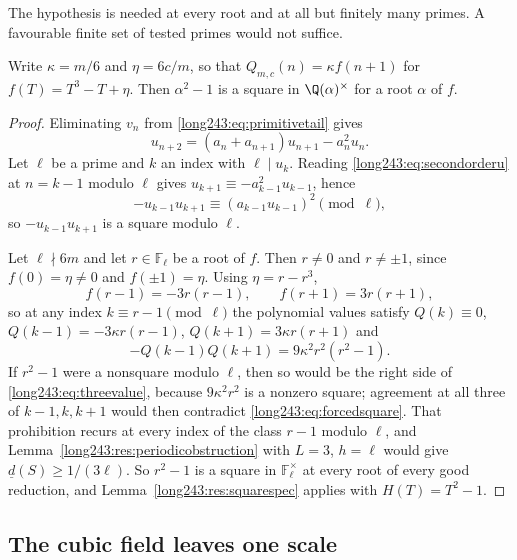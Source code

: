 \documentclass[11pt]{article}
\newcommand{\Fp}{\mathbb{F}}
\begin{document}
The hypothesis is needed at every root and at all but finitely many primes.  A
favourable finite set of tested primes would not suffice.

\begin{proposition}\label{long243:res:transportsquare}
Write $\kappa=m/6$ and $\eta=6c/m$, so that $Q_{m,c}(n)=\kappa f(n+1)$ for
$f(T)=T^3-T+\eta$.  Then $\alpha^2-1$ is a square in $\Q(\alpha)^\times$ for a
root $\alpha$ of $f$.
\end{proposition}

\begin{proof}
Eliminating $v_n$ from \eqref{long243:eq:primitivetail} gives
\begin{equation}\label{long243:eq:secondorderu}
 u_{n+2}=(a_n+a_{n+1})u_{n+1}-a_n^2u_n .
\end{equation}
Let $\ell$ be a prime and $k$ an index with $\ell\mid u_k$.  Reading
\eqref{long243:eq:secondorderu} at $n=k-1$ modulo $\ell$ gives
$u_{k+1}\equiv-a_{k-1}^2u_{k-1}$, hence
\begin{equation}\label{long243:eq:forcedsquare}
 -u_{k-1}u_{k+1}\equiv(a_{k-1}u_{k-1})^2 \pmod\ell,
\end{equation}
so $-u_{k-1}u_{k+1}$ is a square modulo $\ell$.

Let $\ell\nmid6m$ and let $r\in\Fp_\ell$ be a root of $f$.  Then $r\ne0$ and
$r\ne\pm1$, since $f(0)=\eta\ne0$ and $f(\pm1)=\eta$.  Using $\eta=r-r^3$,
\[
 f(r-1)=-3r(r-1),\qquad f(r+1)=3r(r+1),
\]
so at any index $k\equiv r-1\pmod\ell$ the polynomial values satisfy
$Q(k)\equiv0$, $Q(k-1)=-3\kappa r(r-1)$, $Q(k+1)=3\kappa r(r+1)$ and
\begin{equation}\label{long243:eq:threevalue}
 -Q(k-1)Q(k+1)=9\kappa^2r^2(r^2-1).
\end{equation}
If $r^2-1$ were a nonsquare modulo $\ell$, then so would be the right side of
\eqref{long243:eq:threevalue}, because $9\kappa^2r^2$ is a nonzero square; agreement at
all three of $k-1,k,k+1$ would then contradict \eqref{long243:eq:forcedsquare}.  That
prohibition recurs at every index of the class $r-1$ modulo $\ell$, and
Lemma~\ref{long243:res:periodicobstruction} with $L=3$, $h=\ell$ would give
$\underline d(S)\ge1/(3\ell)$.  So $r^2-1$ is a square in $\Fp_\ell^\times$ at
every root of every good reduction, and Lemma~\ref{long243:res:squarespec} applies with
$H(T)=T^2-1$.
\end{proof}

\subsection{The cubic field leaves one scale}
\end{document}
